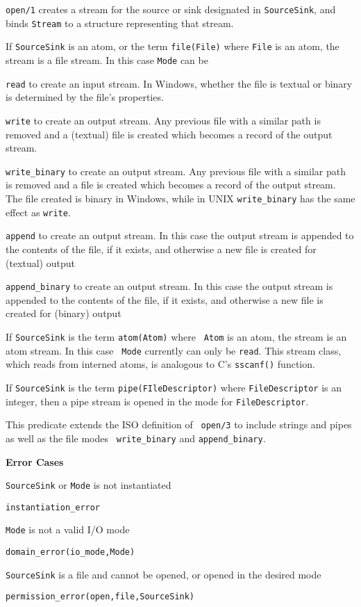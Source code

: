 \begin{description}

%
{\tt open/1} creates a stream for the source or sink designated in
{\tt SourceSink}, and binds {\tt Stream} to a structure representing
that stream.  
%
\bi
\item If {\tt SourceSink} is an atom, or the term {\tt file(File)}
where {\tt File} is an atom, the stream is a file stream.  In this
case {\tt Mode} can be 
\bi
\item {\tt read} to create an input stream.  In Windows, whether the
file is textual or binary is determined by the file's properties.
%
\item {\tt write} to create an output stream.  Any previous file with
a similar path is removed and a (textual) file is created which becomes
a record of the output stream.  
%
\item {\tt write\_binary} to create an output stream.  Any previous file with
a similar path is removed and a file is created which becomes
a record of the output stream.  The file created is binary in Windows,
while in UNIX {\tt write\_binary} has the same effect as {\tt write}.
%
\item {\tt append} to create an output stream.  In this case the
output stream is appended to the contents of the file, if it exists,
and otherwise a new file is created for (textual) output
%
\item {\tt append\_binary} to create an output stream.  In this case the
output stream is appended to the contents of the file, if it exists,
and otherwise a new file is created for (binary) output
\ei
\item If {\tt SourceSink} is the term {\tt atom(Atom)} where {\tt
Atom} is an atom, the stream is an atom stream.  In this case {\tt
Mode} currently can only be {\tt read}.  This stream class, which
reads from interned atoms, is analogous to C's {\tt sscanf()}
function.
%
\item If {\tt SourceSink} is the term {\tt pipe(FIleDescriptor)}
where {\tt FileDescriptor} is an integer, then a pipe stream is opened
in the mode for {\tt FileDescriptor}.
\ei

\compatibility This predicate extends the ISO definition of {\tt
open/3} to include strings and pipes as well as the file modes {\tt
write\_binary} and {\tt append\_binary}.

{\bf Error Cases}
\bi
\item 	{\tt SourceSink} or {\tt Mode} is not instantiated
\bi
\item 	{\tt instantiation\_error}
\ei
%
\item 	{\tt Mode} is not a valid I/O mode
\bi
\item 	{\tt domain\_error(io\_mode,Mode)}
\ei
%
\item 	{\tt SourceSink} is a file and cannot be opened, or opened in
the desired mode 
\bi
\item 	{\tt permission\_error(open,file,SourceSink)}
\ei
\ei


\end{description}
